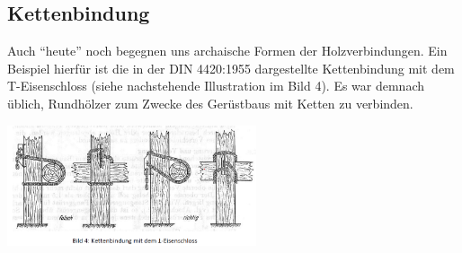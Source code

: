 \documentclass[fleqn,twoside]{article}
\begin{document}
\subsection{Kettenbindung}
Auch \enquote{heute} noch begegnen uns archaische Formen der Holzverbindungen. Ein Beispiel hierfür ist die
in der DIN 4420:1955 dargestellte Kettenbindung mit dem T-Eisenschloss (siehe nachstehende
Illustration im Bild 4). Es war demnach üblich, Rundhölzer zum Zwecke des Gerüstbaus mit Ketten zu
verbinden.
\begin{center} \includegraphics[width=0.55\textwidth]{Grafiken/Geschichte des Holzbaus/Kettenbindungen.png} \end{center}
\end{document}
